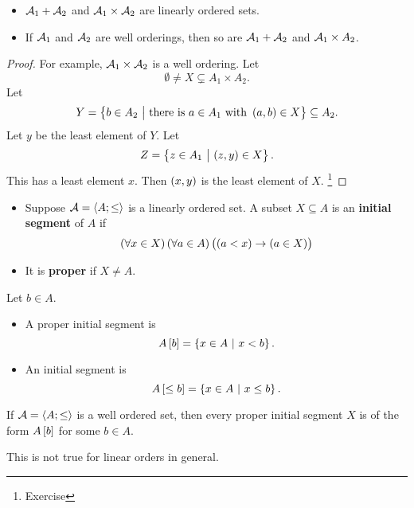 \begin{lemma}
\hfill
\begin{itemize}
\item $ \mathcal{A}_1 + \mathcal{A}_2 $ and $ \mathcal{A}_1 \times \mathcal{A}_2 $ are linearly ordered sets.
\item If $ \mathcal{A}_1 $ and $ \mathcal{A}_2 $ are well orderings, then so are $ \mathcal{A}_1 + \mathcal{A}_2 $ and $ \mathcal{A}_1 \times A_2 $.
\end{itemize}
\end{lemma}

\begin{proof}
For example, $ \mathcal{A}_1 \times \mathcal{A}_2 $ is a well ordering. Let
$$ \emptyset \ne X \subsetneq A_1 \times A_2. $$
Let
$$ Y = \cbr{b \in A_2 \st \text{there is} \ a \in A_1 \ \text{with} \ \br{a, b} \in X} \subseteq A_2. $$
Let $ y $ be the least element of $ Y $. Let
$$ Z = \cbr{z \in A_1 \st \br{z, y} \in X}. $$
This has a least element $ x $. Then $ \br{x, y} $ is the least element of $ X $. \footnote{Exercise}
\end{proof}

\begin{definition}
\hfill
\begin{itemize}
\item Suppose $ \mathcal{A} = \left\langle A; \le \right\rangle $ is a linearly ordered set. A subset $ X \subseteq A $ is an \textbf{initial segment} of $ A $ if
$$ \fab{x \in X}\fab{a \in A}\impb{\ltb{a}{x}}{\inb{a}{X}} $$
\item It is \textbf{proper} if $ X \ne A $.
\end{itemize}
\end{definition}

\begin{example*}
Let $ b \in A $.
\begin{itemize}
\item A proper initial segment is
$$ A\sbr{b} = \cbr{x \in A \st x < b}. $$
\item An initial segment is
$$ A\sbr{\le b} = \cbr{x \in A \st x \le b}. $$
\end{itemize}
\end{example*}

\begin{lemma}
\label{lem:3.3.6}
If $ \mathcal{A} = \left\langle A; \le \right\rangle $ is a well ordered set, then every proper initial segment $ X $ is of the form $ A\sbr{b} $ for some $ b \in A $.
\end{lemma}

\begin{remark*}
This is not true for linear orders in general.
\end{remark*}

